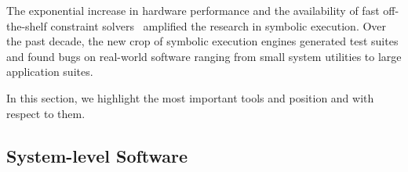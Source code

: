 The exponential increase in hardware performance and the availability of fast off-the-shelf constraint solvers~\cite{chaff,minisat,stp,Z3,cvc} amplified the research in symbolic execution.  Over the past decade, the new crop of symbolic execution engines generated test suites and found bugs on real-world software ranging from small system utilities to large application suites.

In this section, we highlight the most important tools and position \cnine and \chef with respect to them.

\subsection{System-level Software}









